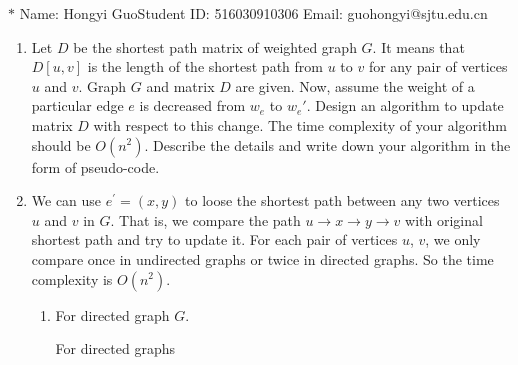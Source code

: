 \documentclass[12pt,a4paper]{article}
\makeatletter
\newtheorem*{solution}{Solution}
\theoremstyle{definition}
\renewenvironment{solution}[1][Solution] {\par\pushQED{\qed}\normalfont\topsep6\p@\@plus6\p@\relax\trivlist\item[\hskip\labelsep\bfseries#1\@addpunct{.}]\ignorespaces}{\popQED\endtrivlist\@endpefalse} \makeatother
\makeatother
\begin{document}
\noindent

\noindent{}
\begin{center}
\footnotesize{\color{blue}$*$ Name: Hongyi Guo\quad Student ID: 516030910306 \quad Email: guohongyi@sjtu.edu.cn}
\end{center}

\begin{enumerate}
\item
Let $D$ be the shortest path matrix of weighted graph $G$. It means that $D[u, v]$ is the length of the shortest path from $u$ to $v$ for any pair of vertices $u$ and $v$. Graph $G$ and matrix $D$ are given. Now, assume the weight of a particular edge $e$ is decreased from $w_e$ to $w_e'$. Design an algorithm to update matrix $D$ with respect to this change. The time complexity of your algorithm should be $O(n^2)$. Describe the details and write down your algorithm in the form of pseudo-code.

\begin{solution} We can use $e^\prime=(x,y)$ to loose the shortest path between any two vertices $u$ and $v$ in $G$. That is, we compare the path $u\rightarrow x\rightarrow y\rightarrow v$ with original shortest path and try to update it. For each pair of vertices $u$, $v$, we only compare once in undirected graphs or twice in directed graphs. So the time complexity is $O(n^2)$.

\begin{enumerate}
	\item For directed graph $G$.
	
	\begin{minipage}{0.9\textwidth}
		\begin{algorithm}[H]
			\BlankLine
			\caption{For directed graphs}
			\BlankLine
			
		\end{algorithm}
	\end{minipage}


\end{enumerate}
\end{solution}
\end{enumerate}
\end{document}
